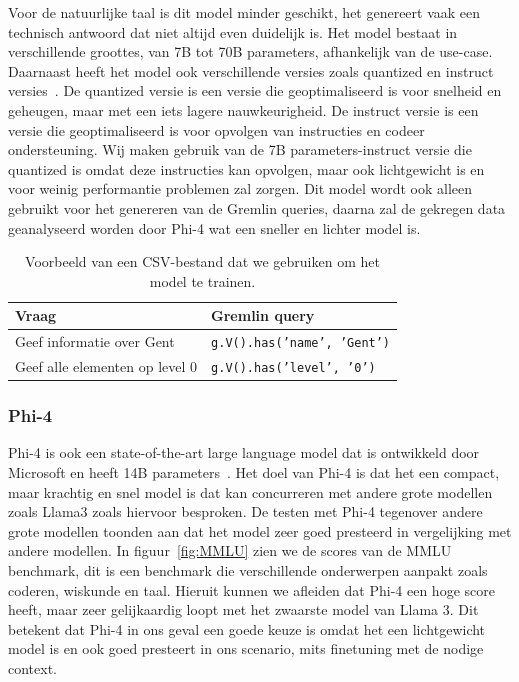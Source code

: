 Voor de natuurlijke taal is dit model minder geschikt, het genereert vaak een technisch antwoord dat niet altijd even duidelijk is.
Het model bestaat in verschillende groottes, van 7B tot 70B parameters, afhankelijk van de use-case.
Daarnaast heeft het model ook verschillende versies zoals quantized en instruct versies~\autocite{HuggingFaceCodellama}.
De quantized versie is een versie die geoptimaliseerd is voor snelheid en geheugen, maar met een iets lagere nauwkeurigheid.
De instruct versie is een versie die geoptimaliseerd is voor opvolgen van instructies en codeer ondersteuning.
Wij maken gebruik van de 7B parameters-instruct versie die quantized is omdat deze instructies kan opvolgen, maar ook lichtgewicht is en voor weinig performantie problemen zal zorgen.
Dit model wordt ook alleen gebruikt voor het genereren van de Gremlin queries, daarna zal de gekregen data geanalyseerd worden door Phi-4 wat een sneller en lichter model is.

\begin{table}[H]
     \begin{tabular}{lp{}}
         \toprule
         \textbf{Vraag} & \textbf{Gremlin query} \\
         \toprule
         Geef informatie over Gent & \texttt{g.V().has('name', 'Gent')} \\
         \midrule
         Geef alle elementen op level 0 & \texttt{g.V().has('level', '0')} \\
         \bottomrule
     \end{tabular}
     \caption[Voorbeeld CSV-bestand.]{\label{tab:csv}Voorbeeld van een CSV-bestand dat we gebruiken om het model te trainen.}
 \end{table}
 
\subsubsection{Phi-4}{\label{sec:phi4}}
Phi-4 is ook een state-of-the-art large language model dat is ontwikkeld door Microsoft en heeft 14B parameters~\autocite{Kamar2024}.
Het doel van Phi-4 is dat het een compact, maar krachtig en snel model is dat kan concurreren met andere grote modellen zoals Llama3 zoals hiervoor besproken.
De testen met Phi-4 tegenover andere grote modellen toonden aan dat het model zeer goed presteerd in vergelijking met andere modellen.
In figuur~\ref{fig:MMLU} zien we de scores van de MMLU benchmark, dit is een benchmark die verschillende onderwerpen aanpakt zoals coderen, wiskunde en taal.
Hieruit kunnen we afleiden dat Phi-4 een hoge score heeft, maar zeer gelijkaardig loopt met het zwaarste model van Llama 3.
Dit betekent dat Phi-4 in ons geval een goede keuze is omdat het een lichtgewicht model is en ook goed presteert in ons scenario, mits finetuning met de nodige context.

